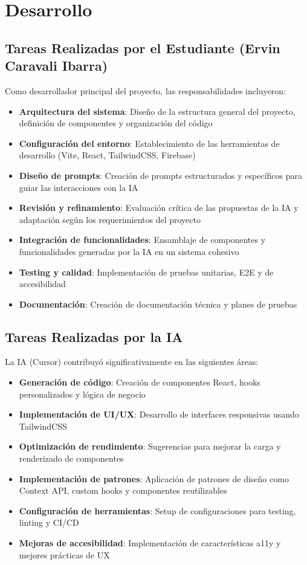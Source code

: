 \documentclass[12pt,a4paper]{article}
\begin{document}
\section{Desarrollo}

\subsection{Tareas Realizadas por el Estudiante (Ervin Caravali Ibarra)}

Como desarrollador principal del proyecto, las responsabilidades incluyeron:

\begin{itemize}
    \item \textbf{Arquitectura del sistema}: Diseño de la estructura general del proyecto, definición de componentes y organización del código
    \item \textbf{Configuración del entorno}: Establecimiento de las herramientas de desarrollo (Vite, React, TailwindCSS, Firebase)
    \item \textbf{Diseño de prompts}: Creación de prompts estructurados y específicos para guiar las interacciones con la IA
    \item \textbf{Revisión y refinamiento}: Evaluación crítica de las propuestas de la IA y adaptación según los requerimientos del proyecto
    \item \textbf{Integración de funcionalidades}: Ensamblaje de componentes y funcionalidades generadas por la IA en un sistema cohesivo
    \item \textbf{Testing y calidad}: Implementación de pruebas unitarias, E2E y de accesibilidad
    \item \textbf{Documentación}: Creación de documentación técnica y planes de pruebas
\end{itemize}

\subsection{Tareas Realizadas por la IA}

La IA (Cursor) contribuyó significativamente en las siguientes áreas:

\begin{itemize}
    \item \textbf{Generación de código}: Creación de componentes React, hooks personalizados y lógica de negocio
    \item \textbf{Implementación de UI/UX}: Desarrollo de interfaces responsivas usando TailwindCSS
    \item \textbf{Optimización de rendimiento}: Sugerencias para mejorar la carga y renderizado de componentes
    \item \textbf{Implementación de patrones}: Aplicación de patrones de diseño como Context API, custom hooks y componentes reutilizables
    \item \textbf{Configuración de herramientas}: Setup de configuraciones para testing, linting y CI/CD
    \item \textbf{Mejoras de accesibilidad}: Implementación de características a11y y mejores prácticas de UX
\end{itemize}
\end{document}
